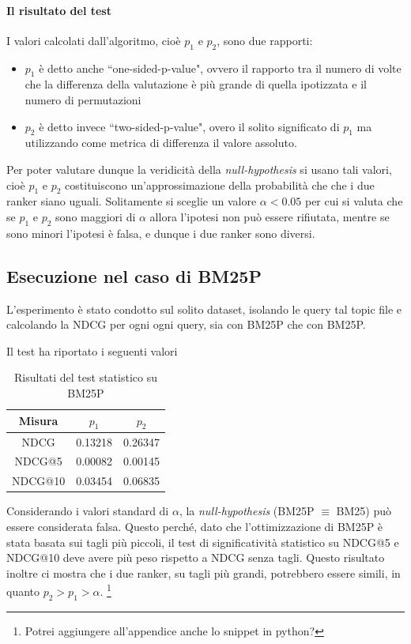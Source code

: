 \paragraph{Il risultato del test}
I valori calcolati dall'algoritmo, cioè $p_1$ e $p_2$, sono due rapporti:

\begin{itemize}
	\item $p_1$ è detto anche ``one-sided-p-value", ovvero il rapporto tra il numero di volte che la differenza
	della valutazione è più grande di quella ipotizzata e il numero di permutazioni
	\item $p_2$ è detto invece ``two-sided-p-value", overo il solito significato di $p_1$ ma utilizzando
	come metrica di differenza il valore assoluto.
\end{itemize}


Per poter valutare dunque la veridicità della \textit{null-hypothesis} si usano tali valori,
cioè $p_1$ e $p_2$ costituiscono un'approssimazione della probabilità che che i due ranker
siano uguali. Solitamente si sceglie un valore $\alpha < 0.05$ per cui si valuta che
se $p_1$ e $p_2$ sono maggiori di $\alpha$ allora l'ipotesi non può essere rifiutata,
mentre se sono minori l'ipotesi è falsa, e dunque i due ranker sono diversi.


\subsection{Esecuzione nel caso di BM25P}
L'esperimento è stato condotto sul solito dataset, isolando le query tal topic file e calcolando la NDCG
per ogni ogni query, sia con BM25P che con BM25P.

Il test ha riportato i seguenti valori

\begin{table}[h!]
	\centering
	\begin{tabular}{|c|c|c|}
		\hline
		\textbf{Misura} & $p_1$ & $p_2$ \\
		\hline
		NDCG  & 0.13218 & 0.26347 \\
		\hline
		NDCG@5 & 0.00082 & 0.00145 \\
		\hline
		NDCG@10 & 0.03454 & 0.06835 \\
		\hline
	\end{tabular}
	\caption{Risultati del test statistico su BM25P}
\end{table}

Considerando i valori standard di $\alpha$, la \textit{null-hypothesis} (BM25P $\equiv$ BM25) può essere considerata falsa.
Questo perché, dato che l'ottimizzazione di BM25P è stata basata sui tagli più piccoli, il test di significatività statistico su NDCG@5 e NDCG@10 
deve avere più peso rispetto a NDCG senza tagli.
Questo risultato inoltre ci mostra che i due ranker, su tagli più grandi, potrebbero essere simili, in quanto $p_2 > p_1 > \alpha$. \footnote{Potrei aggiungere all'appendice anche lo snippet in python?}
